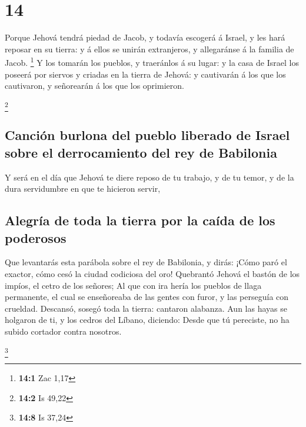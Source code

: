 \hypertarget{section-13}{%
\section{14}\label{section-13}}

 Porque Jehová tendrá piedad de Jacob, y todavía escogerá
á Israel, y les hará reposar en su tierra: y á ellos se unirán
extranjeros, y allegaránse á la familia de Jacob. \footnote{\textbf{14:1}
  Zac 1,17}  Y los tomarán los pueblos, y traeránlos á su
lugar: y la casa de Israel los poseerá por siervos y criadas en la
tierra de Jehová: y cautivarán á los que los cautivaron, y señorearán á
los que los oprimieron.

\footnote{\textbf{14:2} Is 49,22}

\hypertarget{canciuxf3n-burlona-del-pueblo-liberado-de-israel-sobre-el-derrocamiento-del-rey-de-babilonia}{%
\subsection{Canción burlona del pueblo liberado de Israel sobre el
derrocamiento del rey de
Babilonia}\label{canciuxf3n-burlona-del-pueblo-liberado-de-israel-sobre-el-derrocamiento-del-rey-de-babilonia}}

 Y será en el día que Jehová te diere reposo de tu
trabajo, y de tu temor, y de la dura servidumbre en que te hicieron
servir,

\hypertarget{alegruxeda-de-toda-la-tierra-por-la-cauxedda-de-los-poderosos}{%
\subsection{Alegría de toda la tierra por la caída de los
poderosos}\label{alegruxeda-de-toda-la-tierra-por-la-cauxedda-de-los-poderosos}}

 Que levantarás esta parábola sobre el rey de Babilonia, y
dirás: ¡Cómo paró el exactor, cómo cesó la ciudad codiciosa del oro!
 Quebrantó Jehová el bastón de los impíos, el cetro de los
señores;  Al que con ira hería los pueblos de llaga
permanente, el cual se enseñoreaba de las gentes con furor, y las
perseguía con crueldad.  Descansó, sosegó toda la tierra:
cantaron alabanza.  Aun las hayas se holgaron de ti, y los
cedros del Líbano, diciendo: Desde que tú pereciste, no ha subido
cortador contra nosotros.

\footnote{\textbf{14:8} Is 37,24}

